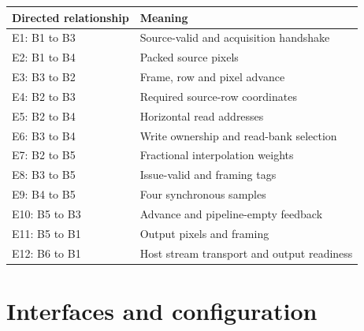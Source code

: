 \documentclass[11pt,a4paper]{article}
\begin{document}
{\small\renewcommand{\arraystretch}{1.18}\begin{longtable}{@{}L{0.24\textwidth}|L{0.7\textwidth}@{}}\toprule

\textbf{Directed relationship} & \textbf{Meaning}\\\midrule\endhead

E1: B1 to B3 & Source-valid and acquisition handshake\\[2pt]\hline

E2: B1 to B4 & Packed source pixels\\[2pt]\hline

E3: B3 to B2 & Frame,\allowbreak{} row and pixel advance\\[2pt]\hline

E4: B2 to B3 & Required source-row coordinates\\[2pt]\hline

E5: B2 to B4 & Horizontal read addresses\\[2pt]\hline

E6: B3 to B4 & Write ownership and read-bank selection\\[2pt]\hline

E7: B2 to B5 & Fractional interpolation weights\\[2pt]\hline

E8: B3 to B5 & Issue-valid and framing tags\\[2pt]\hline

E9: B4 to B5 & Four synchronous samples\\[2pt]\hline

E10: B5 to B3 & Advance and pipeline-empty feedback\\[2pt]\hline

E11: B5 to B1 & Output pixels and framing\\[2pt]\hline

E12: B6 to B1 & Host stream transport and output readiness\\[2pt]\hline

\bottomrule\end{longtable}}

\section{Interfaces and configuration}
\end{document}
